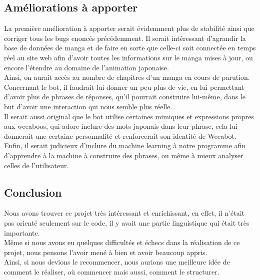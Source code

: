 \documentclass[paper=a4, fontsize=11pt]{article}
\begin{document}
\subsection{Améliorations à apporter}

La première amélioration à apporter serait évidemment plus de stabilité ainsi que corriger tous les bugs enoncés précédemment. Il serait intéressant d'agrandir la base de données de manga et de faire en sorte que celle-ci soit connectée en temps réel au site web afin d'avoir toutes les informations sur le manga mises à jour, ou encore l'étendre au domaine de l'animation japonaise.\\
Ainsi, on aurait accès au nombre de chapitres d'un manga en cours de parution.
Concernant le bot, il faudrait lui donner un peu plus de vie, en lui permettant d'avoir plus de phrases de réponses, qu'il pourrait construire lui-même, dans le but d'avoir une interaction qui nous semble plus réelle.\\
Il serait aussi original que le bot utilise certaines mimiques et expressions propres aux weeaboos, qui adore inclure des mots japonais dans leur phrase, cela lui donnerait une certaine personnalité et renforcerait son identité de Weeabot.\\
Enfin, il serait judicieux d'inclure du machine learning à notre programme afin d'apprendre à la machine à construire des phrases, ou même à mieux analyser celles de l'utilisateur.\\

\subsection{Conclusion}

Nous avons trouver ce projet très intéressant et enrichissant, en effet, il n'était pas orienté seulement sur le code, il y avait une partie linguistique qui était très importante.\\
Même si nous avons eu quelques difficultés et échecs dans la réalisation de ce projet, nous pensons l'avoir mené à bien et avoir beaucoup appris. \\
Ainsi, si nous devions le recommencer, nous aurions une meilleure idée de comment le réaliser, où commencer mais aussi, comment le structurer.\\
\end{document}
